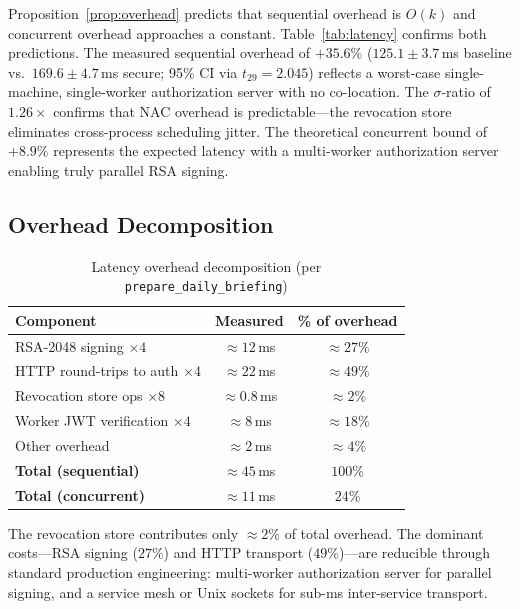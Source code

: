 \documentclass[journal]{IEEEtran}
\begin{document}
Proposition~\ref{prop:overhead} predicts that sequential overhead is $O(k)$
and concurrent overhead approaches a constant. Table~\ref{tab:latency}
confirms both predictions. The measured sequential overhead of $+35.6\%$
($125.1 \pm 3.7$\,ms baseline vs.\ $169.6 \pm 4.7$\,ms secure; 95\% CI via
$t_{29} = 2.045$) reflects a worst-case single-machine, single-worker
authorization server with no co-location. The $\sigma$-ratio of $1.26\times$
confirms that NAC overhead is predictable---the revocation store eliminates
cross-process scheduling jitter. The theoretical concurrent bound of $+8.9\%$
represents the expected latency with a multi-worker authorization server enabling
truly parallel RSA signing.

\subsection{Overhead Decomposition}
\label{sec:overhead}

\begin{table}[h]
\caption{Latency overhead decomposition (per \texttt{prepare\_daily\_briefing})}
\label{tab:decomp}
\centering
\footnotesize
\begin{tabular}{lcc}
\toprule
\textbf{Component} & \textbf{Measured} & \textbf{\% of overhead} \\
\midrule
RSA-2048 signing $\times 4$         & $\approx 12$\,ms  & $\approx 27\%$ \\
HTTP round-trips to auth $\times 4$ & $\approx 22$\,ms  & $\approx 49\%$ \\
Revocation store ops $\times 8$     & $\approx 0.8$\,ms & $\approx 2\%$  \\
Worker JWT verification $\times 4$  & $\approx 8$\,ms   & $\approx 18\%$ \\
Other overhead                      & $\approx 2$\,ms   & $\approx 4\%$  \\
\midrule
\textbf{Total (sequential)}         & $\approx 45$\,ms  & $100\%$ \\
\textbf{Total (concurrent)}         & $\approx 11$\,ms  & $24\%$  \\
\bottomrule
\end{tabular}
\end{table}

The revocation store contributes only $\approx 2\%$ of total overhead. The
dominant costs---RSA signing ($27\%$) and HTTP transport ($49\%$)---are
reducible through standard production engineering: multi-worker authorization
server for parallel signing, and a service mesh or Unix sockets for sub-ms
inter-service transport.
\end{document}

